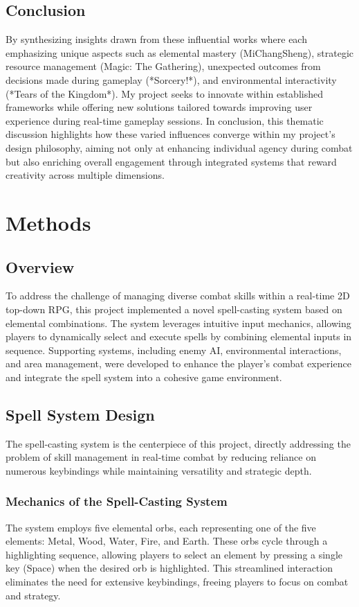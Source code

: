 \documentclass[10pt,twocolumn]{article}
\begin{document}
\subsection{Conclusion}
By synthesizing insights drawn from these influential works where each emphasizing unique aspects such as elemental mastery (MiChangSheng), strategic resource management (Magic: The Gathering), unexpected outcomes from decisions made during gameplay (*Sorcery!*), and environmental interactivity (*Tears of the Kingdom*). My project seeks to innovate within established frameworks while offering new solutions tailored towards improving user experience during real-time gameplay sessions.
In conclusion, this thematic discussion highlights how these varied influences converge within my project’s design philosophy, aiming not only at enhancing individual agency during combat but also enriching overall engagement through integrated systems that reward creativity across multiple dimensions.

\section{Methods}

\subsection{Overview}
To address the challenge of managing diverse combat skills within a real-time 2D top-down RPG, this project implemented a novel spell-casting system based on elemental combinations. The system leverages intuitive input mechanics, allowing players to dynamically select and execute spells by combining elemental inputs in sequence. Supporting systems, including enemy AI, environmental interactions, and area management, were developed to enhance the player's combat experience and integrate the spell system into a cohesive game environment.

\subsection{Spell System Design}
The spell-casting system is the centerpiece of this project, directly addressing the problem of skill management in real-time combat by reducing reliance on numerous keybindings while maintaining versatility and strategic depth.

\subsubsection{Mechanics of the Spell-Casting System}
The system employs five elemental orbs, each representing one of the five elements: Metal, Wood, Water, Fire, and Earth. These orbs cycle through a highlighting sequence, allowing players to select an element by pressing a single key (Space) when the desired orb is highlighted. This streamlined interaction eliminat\textbf{}es the need for extensive keybindings, freeing players to focus on combat and strategy.
\end{document}
